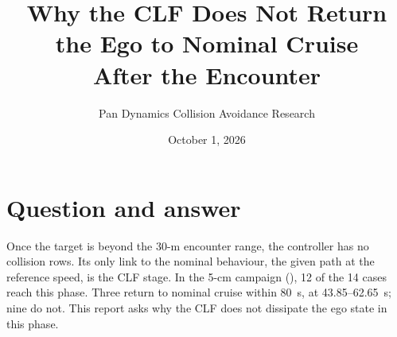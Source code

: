 \documentclass[11pt]{article}
\title{Why the CLF Does Not Return the Ego to Nominal Cruise\\After the Encounter}
\author{Pan Dynamics Collision Avoidance Research}
\date{October 1, 2026}
\begin{document}
\maketitle

\section{Question and answer}
Once the target is beyond the 30-m encounter range, the controller has no
collision rows. Its only link to the nominal behaviour, the given path at the
reference speed, is the CLF stage. In the 5-cm campaign
(), 12 of the 14 cases reach this phase.
Three return to nominal cruise within 80~s, at 43.85--62.65~s; nine do not. This
report asks why the CLF does not dissipate the ego state in this phase.
\end{document}
